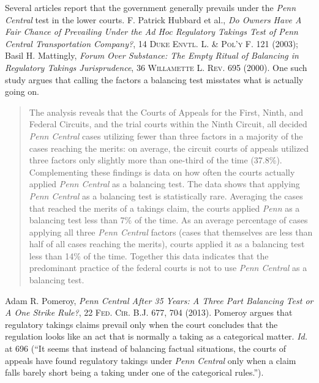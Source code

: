 \item Several articles report that the government generally prevails under the
\emph{Penn Central} test in the lower courts. F. Patrick Hubbard et al.,
\emph{Do Owners Have
A Fair Chance of Prevailing Under the Ad Hoc Regulatory Takings Test of Penn
Central Transportation Company?}, 14 \textsc{Duke Envtl. L. \& Pol'y F}. 121
(2003); Basil H. Mattingly, \emph{Forum Over Substance: The Empty Ritual of
Balancing
in Regulatory Takings Jurisprudence}, 36 \textsc{Willamette L. Rev}. 695 (2000).
One such study argues that calling the factors a balancing test misstates what
is actually going on.
\begin{quote}
The analysis reveals that the Courts of Appeals for the First, Ninth, and
Federal Circuits, and the trial courts within the Ninth Circuit, all decided
\textit{Penn Central} cases utilizing fewer than three factors in a majority of
the cases reaching the merits: on average, the circuit courts of appeals
utilized three factors only slightly more than one-third of the time (37.8\%).
Complementing these findings is data on how often the courts actually applied
\textit{Penn Central} as a balancing test. The data shows that applying
\textit{Penn Central} as a balancing test is statistically rare. Averaging the
cases that reached the merits of a takings claim, the courts applied
\textit{Penn} as a balancing test less than 7\% of the time. As an average
percentage of cases applying all three \textit{Penn Central} factors (cases that
themselves are less than half of all cases reaching the merits), courts applied
it as a balancing test less than 14\% of the time. Together this data indicates
that the predominant practice of the federal courts is not to use \textit{Penn
Central} as a balancing test.
\end{quote}
Adam R. Pomeroy, \textit{Penn Central After 35 Years: A Three Part Balancing
Test or A One Strike Rule?}, 22 \textsc{Fed. Cir. B.J.} 677, 704 (2013).
Pomeroy argues that regulatory takings claims prevail only when the court
concludes that the regulation looks like an act that is normally a taking as a
categorical matter. \textit{Id.} at 696 (``It seems that instead of balancing
factual situations, the courts of appeals have found regulatory takings under
\textit{Penn Central} only when a claim falls barely short being a taking under
one of the categorical rules.'').


